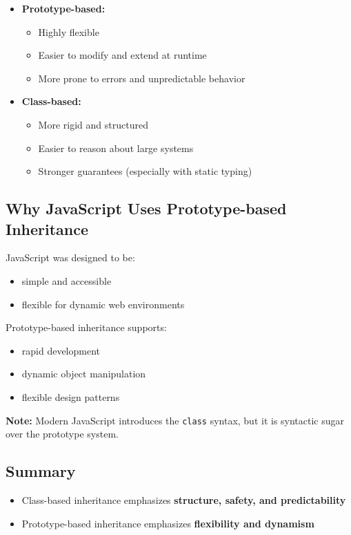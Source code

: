 \documentclass{scrbook}
\begin{document}
\begin{itemize}
    \item \textbf{Prototype-based:}
    \begin{itemize}
        \item Highly flexible
        \item Easier to modify and extend at runtime
        \item More prone to errors and unpredictable behavior
    \end{itemize}
    
    \item \textbf{Class-based:}
    \begin{itemize}
        \item More rigid and structured
        \item Easier to reason about large systems
        \item Stronger guarantees (especially with static typing)
    \end{itemize}
\end{itemize}

\subsection{Why JavaScript Uses Prototype-based Inheritance}

JavaScript was designed to be:
\begin{itemize}
    \item simple and accessible
    \item flexible for dynamic web environments
\end{itemize}

Prototype-based inheritance supports:
\begin{itemize}
    \item rapid development
    \item dynamic object manipulation
    \item flexible design patterns
\end{itemize}

\textbf{Note:}  
Modern JavaScript introduces the \texttt{class} syntax, but it is syntactic sugar over the prototype system.

\subsection{Summary}

\begin{itemize}
    \item Class-based inheritance emphasizes \textbf{structure, safety, and predictability}
    \item Prototype-based inheritance emphasizes \textbf{flexibility and dynamism}
\end{itemize}
\end{document}
